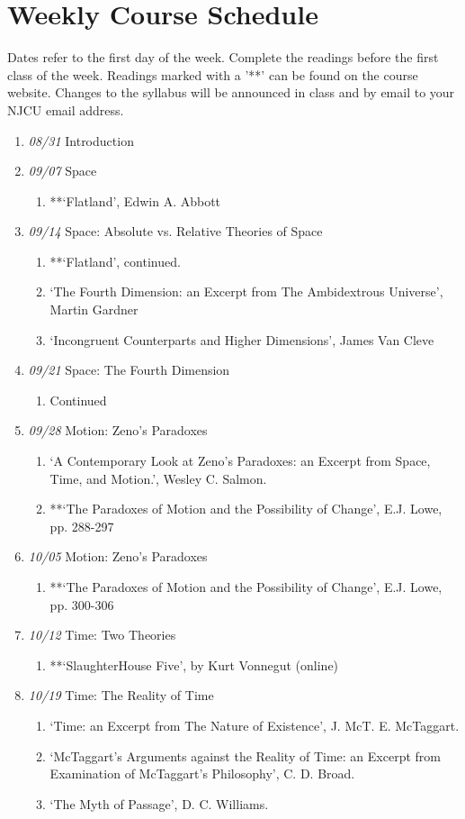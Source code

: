 \documentclass[11pt,article,oneside]{memoir}
\begin{document}
\section{Weekly Course Schedule}
Dates refer to the first day of the week. Complete the readings before the first class of the week. Readings marked with a '**' can be found on the course website. Changes to the syllabus will be announced in class and by email to your NJCU email address.
\begin{enumerate}
\item \textit{08/31} Introduction
\item \textit{09/07} Space
\begin{enumerate}
\item **`Flatland', Edwin A. Abbott
\end{enumerate}
\item \textit{09/14} Space: Absolute vs. Relative Theories of Space
\begin{enumerate}
\item **`Flatland', continued.
\item `The Fourth Dimension: an Excerpt from The Ambidextrous Universe', Martin Gardner
\item `Incongruent Counterparts and Higher Dimensions', James Van Cleve
\end{enumerate}
\item \textit{09/21} Space: The Fourth Dimension
\begin{enumerate}
\item Continued
\end{enumerate}
\item \textit{09/28} Motion: Zeno's Paradoxes
\begin{enumerate}
\item `A Contemporary Look at Zeno’s Paradoxes: an Excerpt from Space, Time, and Motion.', Wesley C. Salmon. 
\item **`The Paradoxes of Motion and the Possibility of Change', E.J. Lowe, pp. 288-297
\end{enumerate}
\item \textit{10/05} Motion: Zeno's Paradoxes
\begin{enumerate}
\item **`The Paradoxes of Motion and the Possibility of Change', E.J. Lowe, pp. 300-306
\end{enumerate}
\item \textit{10/12} Time: Two Theories
\begin{enumerate}
\item **`SlaughterHouse Five', by Kurt Vonnegut (online)
\end{enumerate}
\item  \textit{10/19} Time: The Reality of Time
\begin{enumerate}
\item `Time: an Excerpt from The Nature of Existence', J. McT. E. McTaggart.
\item `McTaggart’s Arguments against the Reality of Time: an Excerpt from Examination of McTaggart’s Philosophy', C. D. Broad.
\item `The Myth of Passage', D. C. Williams.
\end{enumerate}


\end{enumerate}
\end{document}
